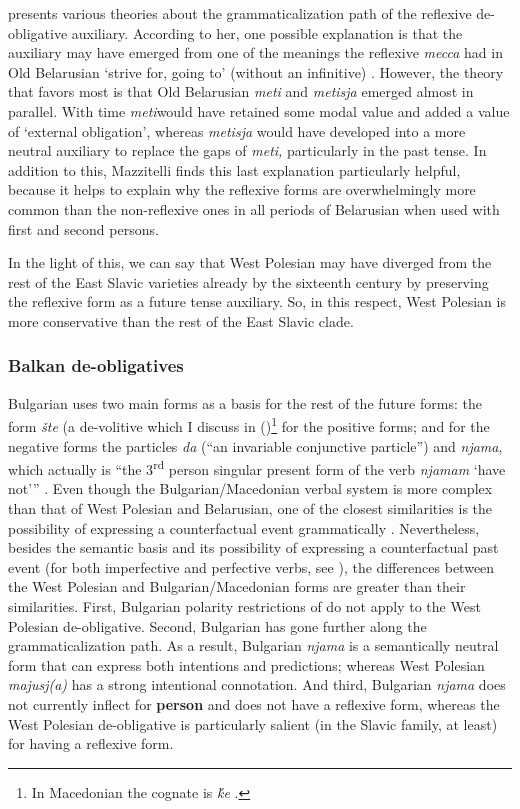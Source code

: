 \documentclass[output=paper,colorlinks,citecolor=brown]{langscibook}
\begin{document}
\citet{Mazzitelli2011} presents various theories about the grammaticalization path of the reflexive de-obligative auxiliary. According to her, one possible explanation is that the auxiliary may have emerged from one of the meanings the reflexive \textit{mecca} had in Old Belarusian ‘strive for, going to’ (without an infinitive) \citep[198]{Mazzitelli2011}. However, the theory that \citet[199--200]{Mazzitelli2011} favors most is that Old Belarusian \textit{meti }and \textit{metisja }emerged almost in parallel. With time\textit{ meti}would have retained some modal value and added a value of ‘external obligation’, whereas \textit{metisja} would have developed into a more neutral auxiliary to replace the gaps of \textit{meti,} particularly in the past tense. In addition to this, Mazzitelli finds this last explanation particularly helpful, because it helps to explain why the reflexive forms are overwhelmingly more common than the non-reflexive ones in all periods of Belarusian when used with first and second persons.

In the light of this, we can say that West Polesian may have diverged from the rest of the East Slavic varieties already by the sixteenth century by preserving the reflexive form as a future tense auxiliary. So, in this respect, West Polesian is more conservative than the rest of the East Slavic clade.

\subsubsection{Balkan de-obligatives}
Bulgarian uses two main forms as a basis for the rest of the future forms: the form \textit{šte }(a de-volitive which I discuss in ()\footnote{In Macedonian the cognate is \textit{ḱe} \citep[323]{Dahl2000b}.} for the positive forms; and for the negative forms the particles \textit{da }(“an invariable conjunctive particle”) and \textit{njama}, which actually is “the 3\textsuperscript{rd} person singular present form of the verb \textit{njamam} ‘have not’” \citep[209]{Kuteva1995}. Even though the Bulgarian/Macedonian verbal system is more complex than that of West Polesian and Belarusian, one of the closest similarities is the possibility of expressing a counterfactual event grammatically \citep[242]{SussexCubberley2006}. Nevertheless, besides the semantic basis and its possibility of expressing a counterfactual past event (for both imperfective and perfective verbs, see \citealt[209--212]{Kuteva1995}), the differences between the West Polesian and Bulgarian/Macedonian forms are greater than their similarities. First, Bulgarian polarity restrictions of do not apply to the West Polesian de-obligative. Second, Bulgarian has gone further along the grammaticalization path. As a result, Bulgarian \textit{njama} is a semantically neutral form that can express both intentions and predictions; whereas West Polesian \textit{majusj(a)} has a strong intentional connotation. And third, Bulgarian \textit{njama} does not currently inflect for \textbf{person} and does not have a reflexive form, whereas the West Polesian de-obligative is particularly salient (in the Slavic family, at least) for having a reflexive form.
\end{document}
